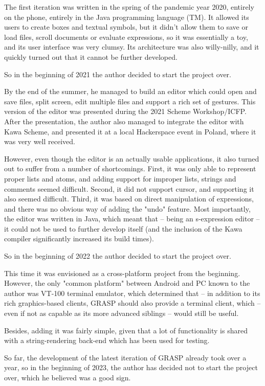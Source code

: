 \documentclass[sigconf]{acmart}
\begin{document}
The first iteration was written in the spring
of the pandemic year 2020, entirely on the phone,
entirely in the Java programming language (TM).
It allowed its users to create boxes and textual
symbols, but it didn't allow them to save or load
files, scroll documents or evaluate expressions,
so it was essentially a toy, and its user
interface was very clumsy. Its architecture
was also willy-nilly, and it quickly turned out
that it cannot be further developed.

So in the beginning of 2021 the author decided
to start the project over.

By the end of the summer, he managed to build an editor
which could open and save files, split screen,
edit multiple files and support a rich set of gestures.
This version of the editor was presented during the 2021 Scheme
Workshop/ICFP. After the presentation, the author
also managed to integrate the editor with Kawa Scheme,
and presented it at a local Hackerspace event in Poland,
where it was very well received.

However, even though the editor is an actually usable
applications, it also turned out to suffer from a number
of shortcomings. First, it was only able to represent
proper lists and atoms, and adding support for improper lists,
strings and comments seemed difficult. Second, it did not support
cursor, and supporting it also seemed difficult.
Third, it was based on direct manipulation of expressions,
and there was no obvious way of adding the "undo" feature.
Most importantly, the editor was written in Java,
which meant that -- being an s-expression editor -- it could
not be used to further develop itself (and the inclusion
of the Kawa compiler significantly increased its build times).

So in the beginning of 2022 the author decided
to start the project over.

This time it was envisioned as a cross-platform project
from the beginning. However, the only "common platform"
between Android and PC known to the author was VT-100
terminal emulator, which determined that -- in addition
to its rich graphics-based clients, GRASP should also provide
a terminal client, which -- even if not as capable
as its more advanced siblings -- would still be useful.

Besides, adding it was fairly simple, given that a lot of
functionality is shared with a string-rendering back-end
which has been used for testing.

So far, the development of the latest iteration of GRASP
already took over a year, so in the beginning of 2023,
the author has decided not to start the project over,
which he believed was a good sign.
\end{document}
